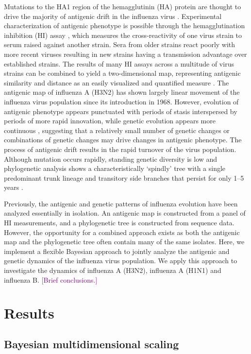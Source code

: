\documentclass[11pt,oneside,letterpaper]{article}
\def\tbc#1{\textcolor{purple}{[#1]}}
\begin{document}
Mutations to the HA1 region of the hemagglutinin (HA) protein are thought to drive the majority of antigenic drift in the influenza virus \cite{Nelson07NatRevGenet}. 
Experimental characterization of antigenic phenotype is possible through the hemagglutination inhibition (HI) assay \cite{Hirst43}, which measures the cross-reactivity of one virus strain to serum raised against another strain. 
Sera from older strains react poorly with more recent viruses resulting in new strains having a transmission advantage over established strains. 
The results of many HI assays across a multitude of virus strains can be combined to yield a two-dimensional map, representing antigenic similarity and distance as an easily visualized and quantified measure \cite{Smith04}. 
The antigenic map of influenza A (H3N2) has shown largely linear movement of the influenza virus population since its introduction in 1968. However, evolution of antigenic phenotype appears punctuated with periods of stasis interspersed by periods of more rapid innovation, while genetic evolution appears more continuous \cite{Smith04}, suggesting that a relatively small number of genetic changes or combinations of genetic changes may drive changes in antigenic phenotype. 
The process of antigenic drift results in the rapid turnover of the virus population. 
Although mutation occurs rapidly, standing genetic diversity is low and phylogenetic analysis shows a characteristically `spindly' tree with a single predominant trunk lineage and transitory side branches that persist for only 1--5 years \cite{Fitch97}.

Previously, the antigenic and genetic patterns of influenza evolution have been analyzed essentially in isolation. 
An antigenic map is constructed from a panel of HI measurements, and a phylogenetic tree is constructed from sequence data. 
However, the opportunity for a combined approach exists as both the antigenic map and the phylogenetic tree often contain many of the same isolates. 
Here, we implement a flexible Bayesian approach to jointly analyze the antigenic and genetic dynamics of the influenza virus population. 
We apply this approach to investigate the dynamics of influenza A (H3N2), influenza A (H1N1) and influenza B. 
\tbc{Brief conclusions.}

\section*{Results}

\subsection*{Bayesian multidimensional scaling}
\end{document}
